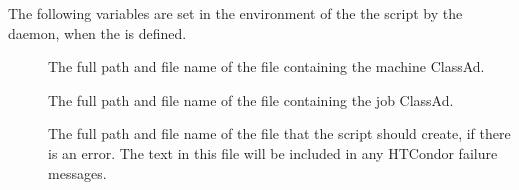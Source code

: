 The following variables are set in the environment of the
the  script by the 
daemon, when the  is defined.
\begin{description}
\item[
]
  The full path and file name of the file containing the machine ClassAd.
\item[
]
  The full path and file name of the file containing the job ClassAd.
\item[
]
  The full path and file name of the file that the 
  script should create, if there is an error.
  The text in this file will be included in any HTCondor failure messages. 
\end{description}

